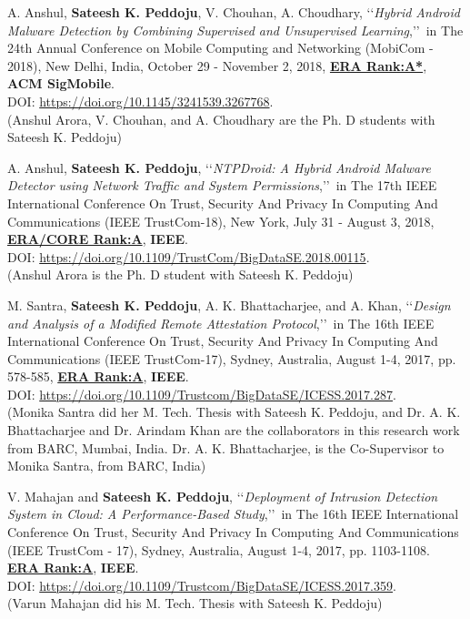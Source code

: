 \begin{etaremune}
		\item
	A. Anshul, \textbf{Sateesh K. Peddoju}, V. Chouhan, A. Choudhary, \lq\lq \textit{Hybrid Android Malware Detection by Combining Supervised and Unsupervised Learning},\rq\rq\, in The 24th Annual Conference on Mobile Computing and Networking (MobiCom - 2018), New Delhi, India, October 29 - November 2, 2018, \underline{\textbf{ERA Rank:A*}}, \textbf{ACM SigMobile}. \\DOI: \url{https://doi.org/10.1145/3241539.3267768}. \\ (Anshul Arora, V. Chouhan, and A. Choudhary are the Ph. D students with Sateesh K. Peddoju)

	
	\item
	A. Anshul, \textbf{Sateesh K. Peddoju}, \lq\lq \textit{NTPDroid: A Hybrid Android Malware Detector using Network Traffic and System Permissions},\rq\rq\, in The 17th IEEE International Conference On Trust, Security And Privacy In Computing And Communications (IEEE TrustCom-18), New York, July 31 - August 3, 2018, \underline{\textbf{ERA/CORE Rank:A}}, \textbf{IEEE}. \\DOI: \url{https://doi.org/10.1109/TrustCom/BigDataSE.2018.00115}. \\ (Anshul Arora is the Ph. D student with Sateesh K. Peddoju)
	
	\item
	M. Santra, \textbf{Sateesh K. Peddoju}, A. K. Bhattacharjee, and A. Khan, \lq\lq \textit{Design and Analysis of a Modified Remote Attestation Protocol},\rq\rq\, in The 16th IEEE International Conference On Trust, Security And Privacy In Computing And Communications (IEEE TrustCom-17), Sydney, Australia, August 1-4, 2017,  pp. 578-585, \underline{\textbf{ERA Rank:A}}, \textbf{IEEE}. \\DOI: \url{https://doi.org/10.1109/Trustcom/BigDataSE/ICESS.2017.287}.	\\(Monika Santra did her M. Tech. Thesis with Sateesh K. Peddoju, and Dr. A. K. Bhattacharjee and Dr. Arindam Khan are the collaborators in this research work from BARC, Mumbai, India. Dr. A. K. Bhattacharjee, is the Co-Supervisor to Monika Santra, from BARC, India)

		
	\item
	V. Mahajan and \textbf{Sateesh K. Peddoju}, \lq\lq \textit{Deployment of Intrusion Detection System in Cloud: A Performance-Based Study},\rq\rq\,  in The 16th IEEE International Conference On Trust, Security And Privacy In Computing And Communications (IEEE TrustCom - 17), Sydney, Australia, August 1-4, 2017,  pp. 1103-1108. \underline{\textbf{ERA Rank:A}}, \textbf{IEEE}. \\ DOI: \url{https://doi.org/10.1109/Trustcom/BigDataSE/ICESS.2017.359}. \\(Varun Mahajan did his M. Tech. Thesis with Sateesh K. Peddoju)


\end{etaremune}
